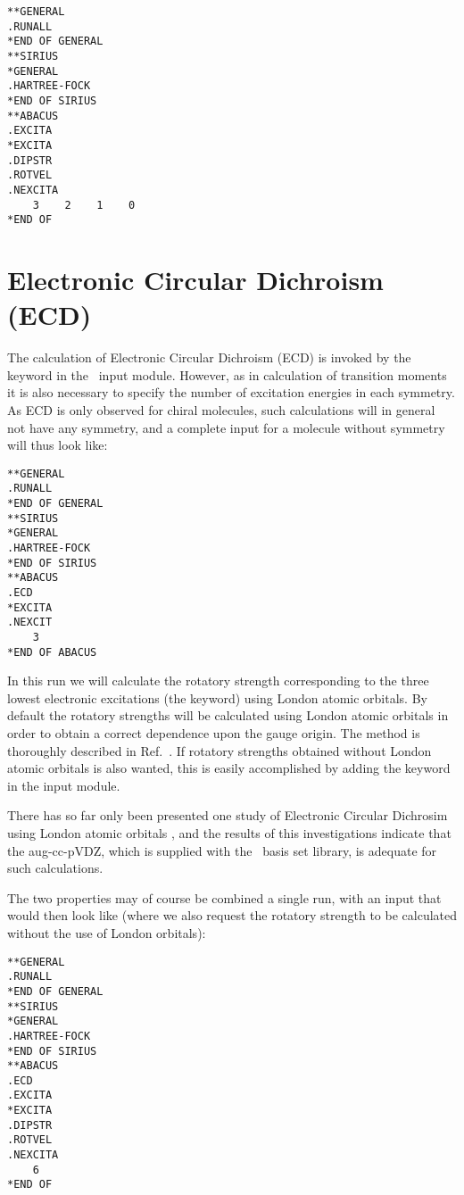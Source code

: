 \begin{verbatim}
**GENERAL
.RUNALL
*END OF GENERAL
**SIRIUS
*GENERAL
.HARTREE-FOCK
*END OF SIRIUS
**ABACUS
.EXCITA
*EXCITA
.DIPSTR
.ROTVEL
.NEXCITA
    3    2    1    0
*END OF
\end{verbatim}

\section{Electronic Circular Dichroism (ECD)}\label{sec:ecd}

The calculation of Electronic Circular Dichroism (ECD) is invoked by
the keyword  in the \aba\ input module. However,
as in calculation of transition moments it is also necessary to
specify the number of excitation energies in 
each symmetry. As ECD is only observed for chiral molecules, such
calculations will in general not have any symmetry, and a complete
input for a molecule without symmetry will thus look like:

\begin{verbatim}
**GENERAL
.RUNALL
*END OF GENERAL
**SIRIUS
*GENERAL
.HARTREE-FOCK
*END OF SIRIUS
**ABACUS
.ECD
*EXCITA
.NEXCIT
    3
*END OF ABACUS
\end{verbatim}

In this run we will calculate the rotatory strength corresponding to
the three lowest electronic excitations (the  keyword)
using London atomic orbitals. By default the rotatory strengths will
be calculated using London atomic orbitals in order to obtain a
correct dependence upon the gauge origin. The method is thoroughly
described in Ref.~\cite{klbaehkrthjopjtca90}. 
If rotatory strengths obtained without London atomic orbitals is also
wanted, this is easily accomplished by adding the keyword
 in the  input module.

There has so far only been presented one study of Electronic Circular
Dichrosim using London atomic orbitals \cite{klbaehkrthjopjtca90}, and the
results of this investigations indicate that the aug-cc-pVDZ, which is
supplied with the \aba\ basis set library, is adequate for such
calculations. 

The two properties may of course be combined a single run, with an
input that would then look like (where we also request the rotatory
strength to be calculated without the use of London orbitals):

\begin{verbatim}
**GENERAL
.RUNALL
*END OF GENERAL
**SIRIUS
*GENERAL
.HARTREE-FOCK
*END OF SIRIUS
**ABACUS
.ECD
.EXCITA
*EXCITA
.DIPSTR
.ROTVEL
.NEXCITA
    6
*END OF
\end{verbatim}

